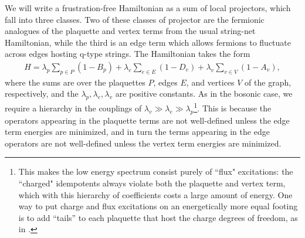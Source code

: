 \documentclass[12pt,a4paper]{article}
\newcounter{arrow}
\newcommand{\mcz}{\mathcal{Z}}
\newcommand{\kw}[1]{{\color{kwcolor}\footnotesize{(KW) #1}}}
\newcommand{\dave}[1]{{\color{ao(english)}\footnotesize{(DA) #1}}}
\begin{document}
We will write a frustration-free Hamiltonian as a sum of local projectors, which fall into
three classes.
Two of these classes of projector are the fermionic analogues of the plaquette and vertex terms from the usual string-net Hamiltonian, 
while the third is an edge term which allows fermions to fluctuate across edges hosting q-type strings.
The Hamiltonian takes the form
\begin{align} \label{ham}
H = \lambda_p \sum_{p \in P} (1-B_p) + \lambda_e \sum_{e \in E} (1-D_e) + \lambda_v \sum_{v \in V} (1-A_v),
\end{align}
where the sums are over the plaquettes $P$, edges $E$, and vertices $V$ of the graph, respectively, and the $\lambda_p,\lambda_e,\lambda_v$ are positive constants.
As in the bosonic case, we require a hierarchy in the couplings of $\lambda_v \gg \lambda_e \gg \lambda_p$\footnote{This makes the low energy spectrum consist purely of ``flux" excitations: 
the ``charged" idempotents always violate both the plaquette and vertex term, which with this hierarchy of coefficients costs a large amount of energy. 
One way to put charge and flux excitations on an energetically more equal footing is to add ``tails'' to each 
plaquette that host the charge degrees of freedom, as in \cite{hu2015}.}.
This is because the operators appearing in the plaquette terms are not well-defined unless the edge term energies are minimized, and in turn the terms appearing in the edge operators are not well-defined unless the vertex term energies are minimized.
\end{document}
